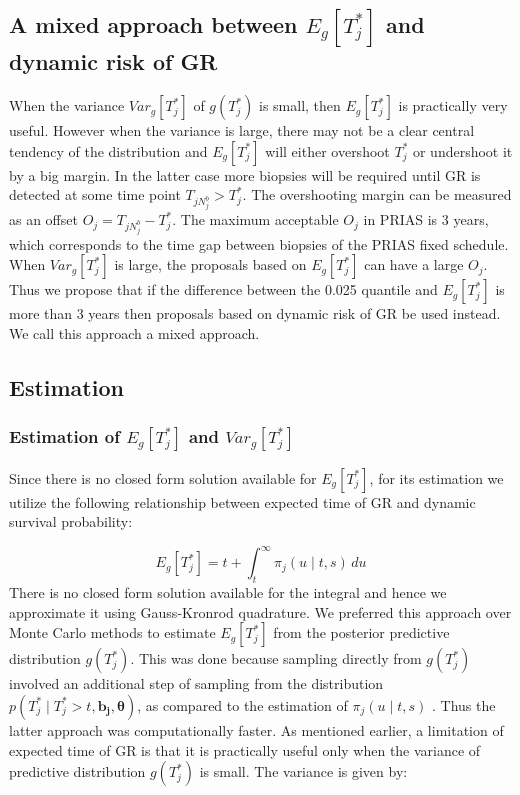 \subsection{A mixed approach between $E_g[T^*_j]$ and dynamic risk of GR}
When the variance $Var_g[T^*_j]$ of $g(T^*_j)$ is small, then $E_g[T^*_j]$ is practically very useful. However when the variance is large, there may not be a clear central tendency of the distribution and $E_g[T^*_j]$ will either overshoot $T^*_j$ or undershoot it by a big margin. In the latter case more biopsies will be required until GR is detected at some time point $T_{j{N_j^b}} >  T^*_j$. The overshooting margin can be measured as an offset $O_j = T_{j{N_j^b}} - T_j^*$. The maximum acceptable $O_j$ in PRIAS is 3 years, which corresponds to the time gap between biopsies of the PRIAS fixed schedule. When $Var_g[T^*_j]$ is large, the proposals based on $E_g[T^*_j]$ can have a large $O_j$. Thus we propose that if the difference between the 0.025 quantile and $E_g[T^*_j]$ is more than 3 years then proposals based on dynamic risk of GR be used instead. We call this approach a mixed approach.

\subsection{Estimation}
\subsubsection{Estimation of $E_g[T^*_j]$ and $Var_g[T^*_j]$}
Since there is no closed form solution available for $E_g[T^*_j]$, for its estimation we utilize the following relationship between expected time of GR and dynamic survival probability:

\begin{equation*}
E_g[T^*_j] = t + \int_t^\infty \pi_j(u \mid t, s) \,du
\end{equation*}
There is no closed form solution available for the integral and hence we approximate it using Gauss-Kronrod quadrature. We preferred this approach over Monte Carlo methods to estimate $E_g[T^*_j]$ from the posterior predictive distribution $g(T^*_j)$. This was done because sampling directly from $g(T^*_j)$ involved an additional step of sampling from the distribution $p(T^*_j \mid T^*_j > t, \boldsymbol{b_j}, \boldsymbol{\theta})$, as compared to the estimation of $\pi_j(u \mid t, s)$ \citep{rizopoulos2011dynamic}. Thus the latter approach was computationally faster. As mentioned earlier, a limitation of expected time of GR is that it is practically useful only when the variance of predictive distribution $g(T^*_j)$ is small. The variance is given by:

